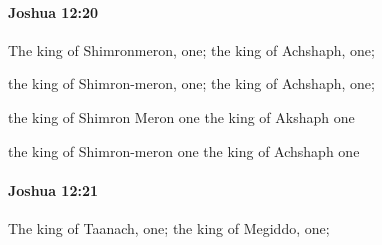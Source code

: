 		\paragraph{Joshua 12:20} %
			\label{JOSHUA-12-20}

			The king of Shimronmeron, one; the king of Achshaph, one;

			\begin{versebox}
					\item[BHS] 
					\item[ASV] the king of Shimron-meron, one; the king of Achshaph, one;
					\item[NIV] the king of Shimron Meron one the king of Akshaph one
					\item[NRSV] the king of Shimron-meron one the king of Achshaph one
			\end{versebox}

		\paragraph{Joshua 12:21} %
			\label{JOSHUA-12-21}

			The king of Taanach, one; the king of Megiddo, one;

